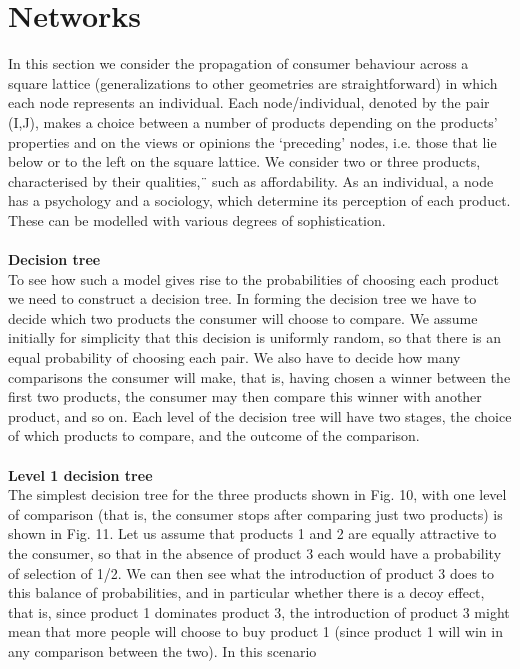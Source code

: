 \section{Networks} \label{sec:networks}
In this section we consider the propagation of consumer behaviour across a square lattice
(generalizations to other geometries are straightforward) in which each node represents an individual.
Each node/individual, denoted by the pair (I,J), makes a choice between a number of products depending on
the products’ properties and on the views or opinions the ‘preceding’ nodes, i.e. those that lie below
or to the left on the square lattice. We consider two or three products, characterised by their qualities,¨
such as affordability. As an individual, a node has a psychology and a sociology, which determine its
perception of each product. These can be modelled with various degrees of sophistication.\\
\\
\textbf{Decision tree} \label{subsec:tree}\\
To see how such a model gives rise to the probabilities of choosing each product we need to
construct a decision tree. In forming the decision tree we have to decide which two  products the consumer
will choose to compare. We assume initially for simplicity that this decision is uniformly random, so that
there is an equal probability of choosing each pair. We also have to decide how many comparisons the consumer
will make, that is, having chosen a winner between the first two products, the consumer may then compare
this winner with another product, and so on. Each level of the decision tree will have two stages, the choice
of which products to compare, and the outcome of the comparison.\\
\\
\textbf{Level 1 decision tree}\\
The simplest decision tree for the three products shown in Fig. 10, with one level of
comparison (that is, the consumer stops after comparing just two products) is shown in Fig. 11.
Let us assume that products 1 and 2 are equally attractive to the consumer, so that in the absence of
product 3 each would have a probability of selection of 1/2. We can then see what the introduction of
product 3 does to this balance of probabilities, and in particular whether there is a decoy effect,
that is, since product 1 dominates product 3, the introduction of product 3 might mean that more people
will choose to buy product 1 (since product 1 will win in any comparison between the two). In this scenario
